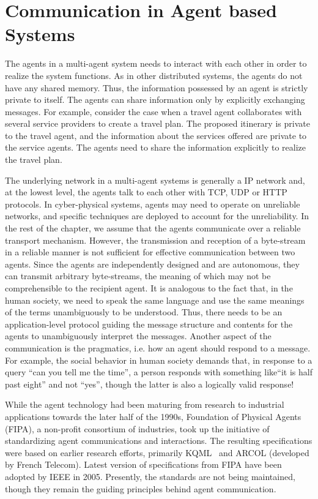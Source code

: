 \section{Communication in Agent based Systems}

The agents in a multi-agent system needs to interact with each other in order to realize the system functions. As in other 
distributed systems, the agents do not have any shared memory. Thus, the information possessed by an agent is strictly
private to itself. The agents can share information only by explicitly exchanging messages. 
%
For example, consider the case when a travel agent collaborates with several service providers to create a travel plan.
The proposed itinerary is private to the travel agent, and the information about the services offered are private to the 
service agents. The agents need to share the information explicitly to realize the travel plan.

The underlying network in a multi-agent systems is generally a IP network and, at the lowest level, the agents talk to 
each other with TCP, UDP or HTTP protocols. In cyber-physical systems, agents may need to operate on unreliable networks,
and specific techniques are deployed to account for the unreliability. In the rest of the chapter, we assume that the 
agents communicate over a reliable transport mechanism.
%
However, the transmission and reception of a byte-stream in a reliable manner is not sufficient for effective communication
between two agents. Since the agents are independently designed and are autonomous, they can transmit arbitrary byte-streams,
the meaning of which may not be comprehensible to the recipient agent. It is analogous to the fact that, in the human society,
we need to speak the same language and use the same meanings of the terms unambiguously to be understood. Thus, there needs 
to be an application-level protocol guiding the message structure and contents for the agents to unambiguously interpret the 
messages. Another aspect of the communication is the pragmatics, i.e. how an agent should respond to a message. For example, 
the social behavior in human society demands that, in response to a query ``can you tell me the time'', a person responds with 
something like``it is half past eight'' and not ``yes'', though the latter is also a logically valid response! 

 
 
While the agent technology had been maturing from research to industrial applications towards the later half of the 1990s, 
Foundation of Physical Agents (FIPA), a non-profit consortium of industries, took up the initiative of standardizing agent 
communications and interactions. The resulting specifications were based on earlier research efforts, primarily KQML~\citep{Finin:1994} 
and ARCOL (developed by French Telecom). Latest version of specifications from FIPA have been adopted by IEEE in 
2005. Presently, the standards are not being maintained, though they remain the guiding principles behind agent communication. 

